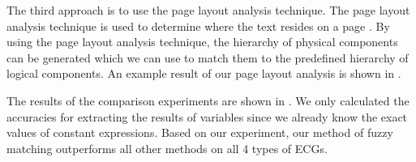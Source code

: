 The third approach is to use the page layout analysis technique. 
The page layout analysis technique is used to determine where the text 
resides on a page \cite{o1993document}\cite{kanungo2003stochastic} \cite{bartoli2014semisupervised}\cite{cai2003vips}. 
By using the page layout analysis technique, the hierarchy of physical components 
can be generated which we can use to match them to the predefined 
hierarchy of logical components. An example result of our page layout 
analysis is shown in .


The results of the comparison experiments are shown in . 
We only calculated the accuracies for extracting the results of 
variables since we already know the exact values of constant 
expressions. Based on our experiment, our method of fuzzy matching 
outperforms all other methods on all 4 types of ECGs. 

